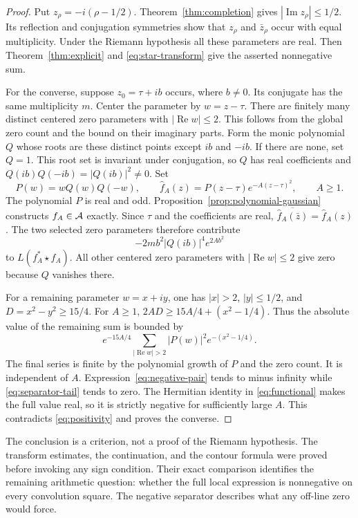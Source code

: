 \begin{proof}
Put $z_\rho=-i(\rho-1/2)$.
Theorem~\ref{thm:completion} gives $|\operatorname{Im}z_\rho|\leq1/2$.
Its reflection and conjugation symmetries show that $z_\rho$ and
$\bar z_\rho$ occur with equal multiplicity.
Under the Riemann hypothesis all these parameters are real.
Then Theorem~\ref{thm:explicit} and \eqref{eq:star-transform} give the
asserted nonnegative sum.

For the converse, suppose $z_0=\tau+ib$ occurs, where $b\ne0$.
Its conjugate has the same multiplicity $m$.
Center the parameter by $w=z-\tau$.
There are finitely many distinct centered zero parameters with
$|\operatorname{Re}w|\leq2$.
This follows from the global zero count and the bound on their imaginary
parts.  Form the monic polynomial $Q$ whose roots are these distinct points
except $ib$ and $-ib$.  If there are none, set $Q=1$.
This root set is invariant under conjugation, so $Q$ has real coefficients
and $Q(ib)Q(-ib)=|Q(ib)|^2\ne0$.
Set
\[
 P(w)=wQ(w)Q(-w),\qquad
 \widehat f_A(z)=P(z-\tau)e^{-A(z-\tau)^2},\qquad A\geq1.
\]
The polynomial $P$ is real and odd.
Proposition~\ref{prop:polynomial-gaussian} constructs $f_A\in\mathcal A$ exactly.
Since $\tau$ and the coefficients are real,
$\overline{\widehat f_A(\bar z)}=\widehat f_A(z)$.
The two selected zero parameters therefore contribute
\begin{equation}
 -2m b^2|Q(ib)|^4e^{2Ab^2}
 \label{eq:negative-pair}
\end{equation}
to $L(f_A^*\star f_A)$.
All other centered zero parameters with $|\operatorname{Re}w|\leq2$
give zero because $Q$ vanishes there.

For a remaining parameter $w=x+iy$, one has $|x|>2$, $|y|\leq1/2$,
and $D=x^2-y^2\geq15/4$.
For $A\geq1$, $2AD\geq15A/4+(x^2-1/4)$.
Thus the absolute value of the remaining sum is bounded by
\begin{equation}
 e^{-15A/4}
 \sum_{|\operatorname{Re}w|>2}|P(w)|^2e^{-(x^2-1/4)}.
 \label{eq:separator-tail}
\end{equation}
The final series is finite by the polynomial growth of $P$ and the zero
count.  It is independent of $A$.
Expression~\eqref{eq:negative-pair} tends to minus infinity while
\eqref{eq:separator-tail} tends to zero.
The Hermitian identity in \eqref{eq:functional} makes the full value real,
so it is strictly negative for sufficiently large $A$.
This contradicts \eqref{eq:positivity} and proves the converse.
\end{proof}

The conclusion is a criterion, not a proof of the Riemann hypothesis.
The transform estimates, the continuation, and the contour formula were
proved before invoking any sign condition.
Their exact comparison identifies the remaining arithmetic question:
whether the full local expression is nonnegative on every convolution square.
The negative separator describes what any off-line zero would force.


